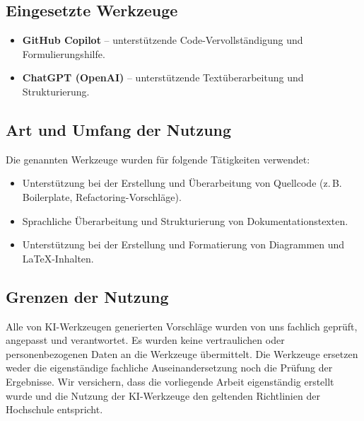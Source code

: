 \subsection{Eingesetzte Werkzeuge}
\begin{itemize}
  \item \textbf{GitHub Copilot} -- unterstützende Code-Vervollständigung und Formulierungshilfe.
  \item \textbf{ChatGPT (OpenAI)} -- unterstützende Textüberarbeitung und Strukturierung.
\end{itemize}

\subsection{Art und Umfang der Nutzung}
Die genannten Werkzeuge wurden für folgende Tätigkeiten verwendet:
\begin{itemize}
  \item Unterstützung bei der Erstellung und Überarbeitung von Quellcode (z.\,B. Boilerplate, Refactoring-Vorschläge).
  \item Sprachliche Überarbeitung und Strukturierung von Dokumentationstexten.
  \item Unterstützung bei der Erstellung und Formatierung von Diagrammen und \LaTeX{}-Inhalten.
\end{itemize}

\subsection{Grenzen der Nutzung}
Alle von KI-Werkzeugen generierten Vorschläge wurden von uns fachlich geprüft, angepasst und verantwortet. Es wurden keine vertraulichen oder personenbezogenen Daten an die Werkzeuge übermittelt. Die Werkzeuge ersetzen weder die eigenständige fachliche Auseinandersetzung noch die Prüfung der Ergebnisse. Wir versichern, dass die vorliegende Arbeit eigenständig erstellt wurde und die Nutzung der KI-Werkzeuge den geltenden Richtlinien der Hochschule entspricht.
